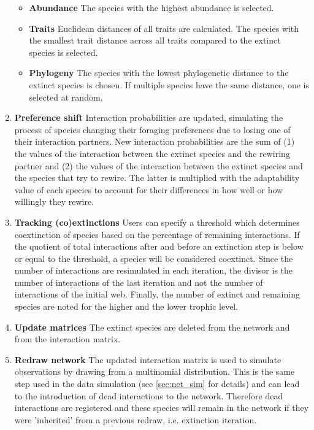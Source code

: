 \documentclass[12pt,a4paper]{article}
\begin{document}
\begin{enumerate}
\begin{itemize}
		\item \label{itm:abund_rew} \textbf{Abundance} {\small The species with the highest abundance is selected.}
		\item \label{itm:trait_rew} \textbf{Traits} {\small Euclidean distances of all traits are calculated. The species with the smallest trait distance across all traits compared to the extinct species is selected.}
		\item \label{itm:phylo_rew} \textbf{Phylogeny} {\small The species with the lowest phylogenetic distance to the extinct species is chosen. If multiple species have the same distance, one is selected at random.}
		\end{itemize}
	\item \label{itm:shift} \textbf{Preference shift} {\small Interaction probabilities are updated, simulating the process of species changing their foraging preferences due to losing one of their interaction partners. New interaction probabilities are the sum of (1) the values of the interaction between the extinct species and the rewiring partner and (2) the values of the interaction between the extinct species and the species that try to rewire. The latter is multiplied with the adaptability value of each species to account for their differences in how well or how willingly they rewire.}
	\item  \label{itm:track} \textbf{Tracking (co)extinctions} {\small Users can specify a threshold which determines coextinction of species based on the percentage of remaining interactions. If the quotient of total interactions after and before an extinction step is below or equal to the threshold, a species will be considered coextinct. Since the number of interactions are resimulated in each iteration, the divisor is the number of interactions of the last iteration and not the number of interactions of the initial web. Finally, the number of extinct and remaining species are noted for the higher and the lower trophic level.}
	\item \label{itm:update} \textbf{Update matrices} {\small The extinct species are deleted from the network and from the interaction matrix.}
	\item \label{itm:redraw} \textbf{Redraw network} {\small The updated interaction matrix is used to simulate observations by drawing from a multinomial distribution. This is the same step used in the data simulation (see \ref{sec:net_sim} for details) and can lead to the introduction of dead interactions to the network. Therefore dead interactions are registered and these species will remain in the network if they were 'inherited' from a previous redraw, i.e. extinction iteration.}
	\end{enumerate}
\end{document}
